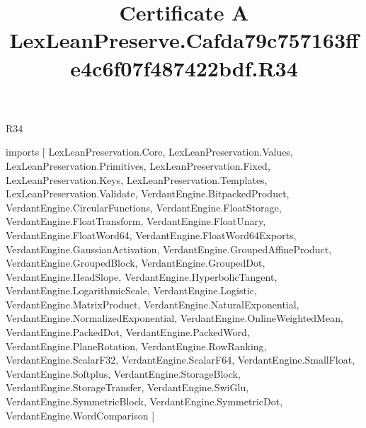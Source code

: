 \begin{lexlean}{R34}
\title{Certificate A LexLeanPreserve.Cafda79c757163ffe4c6f07f487422bdf.R34}
\begin{coremodule}
imports [
  LexLeanPreservation.Core,
  LexLeanPreservation.Values,
  LexLeanPreservation.Primitives,
  LexLeanPreservation.Fixed,
  LexLeanPreservation.Keys,
  LexLeanPreservation.Templates,
  LexLeanPreservation.Validate,
  VerdantEngine.BitpackedProduct,
  VerdantEngine.CircularFunctions,
  VerdantEngine.FloatStorage,
  VerdantEngine.FloatTransform,
  VerdantEngine.FloatUnary,
  VerdantEngine.FloatWord64,
  VerdantEngine.FloatWord64Exports,
  VerdantEngine.GaussianActivation,
  VerdantEngine.GroupedAffineProduct,
  VerdantEngine.GroupedBlock,
  VerdantEngine.GroupedDot,
  VerdantEngine.HeadSlope,
  VerdantEngine.HyperbolicTangent,
  VerdantEngine.LogarithmicScale,
  VerdantEngine.Logistic,
  VerdantEngine.MatrixProduct,
  VerdantEngine.NaturalExponential,
  VerdantEngine.NormalizedExponential,
  VerdantEngine.OnlineWeightedMean,
  VerdantEngine.PackedDot,
  VerdantEngine.PackedWord,
  VerdantEngine.PlaneRotation,
  VerdantEngine.RowRanking,
  VerdantEngine.ScalarF32,
  VerdantEngine.ScalarF64,
  VerdantEngine.SmallFloat,
  VerdantEngine.Softplus,
  VerdantEngine.StorageBlock,
  VerdantEngine.StorageTransfer,
  VerdantEngine.SwiGlu,
  VerdantEngine.SymmetricBlock,
  VerdantEngine.SymmetricDot,
  VerdantEngine.WordComparison
]


\end{coremodule}
\end{lexlean}
